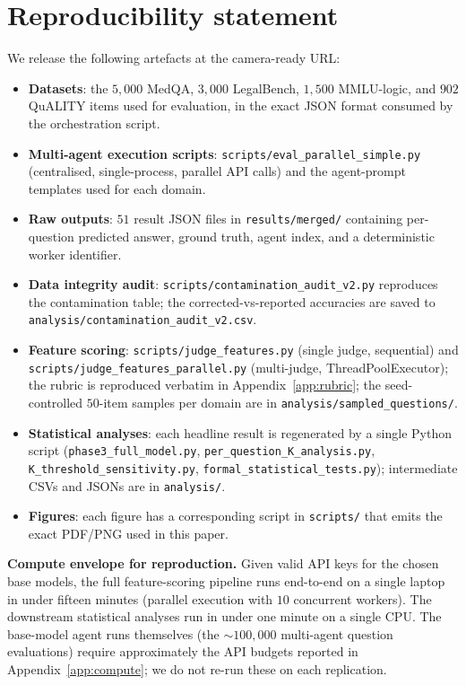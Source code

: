 \documentclass{article}
\begin{document}
\section{Reproducibility statement}
\label{app:repro}

We release the following artefacts at the camera-ready URL:

\begin{itemize}
\item \textbf{Datasets}: the $5{,}000$ MedQA, $3{,}000$ LegalBench, $1{,}500$ MMLU-logic, and $902$ QuALITY items used for evaluation, in the exact JSON format consumed by the orchestration script.
\item \textbf{Multi-agent execution scripts}: \texttt{scripts/eval\_parallel\_simple.py} (centralised, single-process, parallel API calls) and the agent-prompt templates used for each domain.
\item \textbf{Raw outputs}: $51$ result JSON files in \texttt{results/merged/} containing per-question predicted answer, ground truth, agent index, and a deterministic worker identifier.
\item \textbf{Data integrity audit}: \texttt{scripts/contamination\_audit\_v2.py} reproduces the contamination table; the corrected-vs-reported accuracies are saved to \texttt{analysis/contamination\_audit\_v2.csv}.
\item \textbf{Feature scoring}: \texttt{scripts/judge\_features.py} (single judge, sequential) and \texttt{scripts/judge\_features\_parallel.py} (multi-judge, ThreadPoolExecutor); the rubric is reproduced verbatim in Appendix~\ref{app:rubric}; the seed-controlled $50$-item samples per domain are in \texttt{analysis/sampled\_questions/}.
\item \textbf{Statistical analyses}: each headline result is regenerated by a single Python script (\texttt{phase3\_full\_model.py}, \texttt{per\_question\_K\_analysis.py}, \texttt{K\_threshold\_sensitivity.py}, \texttt{formal\_statistical\_tests.py}); intermediate CSVs and JSONs are in \texttt{analysis/}.
\item \textbf{Figures}: each figure has a corresponding script in \texttt{scripts/} that emits the exact PDF/PNG used in this paper.
\end{itemize}

\textbf{Compute envelope for reproduction.} Given valid API keys for the chosen base models, the full feature-scoring pipeline runs end-to-end on a single laptop in under fifteen minutes (parallel execution with $10$ concurrent workers). The downstream statistical analyses run in under one minute on a single CPU. The base-model agent runs themselves (the $\sim$$100{,}000$ multi-agent question evaluations) require approximately the API budgets reported in Appendix~\ref{app:compute}; we do not re-run these on each replication.
\end{document}
